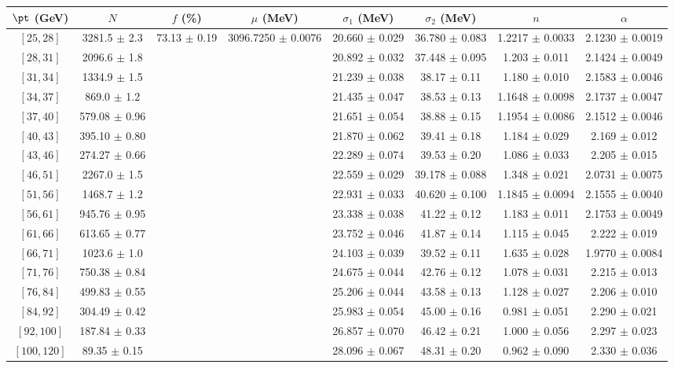 \begin{tabular}{c||c|c|c|c|c|c|c}
$\pt$ (GeV) & $N$ & $f$ (\%) & $\mu$ (MeV) & $\sigma_1$ (MeV) & $\sigma_2$ (MeV) & $n$ & $\alpha$ \\
\hline
$[25, 28]$ & 3281.5 $\pm$ 2.3 & \multirow{17}{*}{73.13 $\pm$ 0.19} & \multirow{17}{*}{3096.7250 $\pm$ 0.0076} & 20.660 $\pm$ 0.029 & 36.780 $\pm$ 0.083 & 1.2217 $\pm$ 0.0033 & 2.1230 $\pm$ 0.0019\\
$[28, 31]$ & 2096.6 $\pm$ 1.8 &  &  & 20.892 $\pm$ 0.032 & 37.448 $\pm$ 0.095 & 1.203 $\pm$ 0.011 & 2.1424 $\pm$ 0.0049\\
$[31, 34]$ & 1334.9 $\pm$ 1.5 &  &  & 21.239 $\pm$ 0.038 & 38.17 $\pm$ 0.11 & 1.180 $\pm$ 0.010 & 2.1583 $\pm$ 0.0046\\
$[34, 37]$ & 869.0 $\pm$ 1.2 &  &  & 21.435 $\pm$ 0.047 & 38.53 $\pm$ 0.13 & 1.1648 $\pm$ 0.0098 & 2.1737 $\pm$ 0.0047\\
$[37, 40]$ & 579.08 $\pm$ 0.96 &  &  & 21.651 $\pm$ 0.054 & 38.88 $\pm$ 0.15 & 1.1954 $\pm$ 0.0086 & 2.1512 $\pm$ 0.0046\\
$[40, 43]$ & 395.10 $\pm$ 0.80 &  &  & 21.870 $\pm$ 0.062 & 39.41 $\pm$ 0.18 & 1.184 $\pm$ 0.029 & 2.169 $\pm$ 0.012\\
$[43, 46]$ & 274.27 $\pm$ 0.66 &  &  & 22.289 $\pm$ 0.074 & 39.53 $\pm$ 0.20 & 1.086 $\pm$ 0.033 & 2.205 $\pm$ 0.015\\
$[46, 51]$ & 2267.0 $\pm$ 1.5 &  &  & 22.559 $\pm$ 0.029 & 39.178 $\pm$ 0.088 & 1.348 $\pm$ 0.021 & 2.0731 $\pm$ 0.0075\\
$[51, 56]$ & 1468.7 $\pm$ 1.2 &  &  & 22.931 $\pm$ 0.033 & 40.620 $\pm$ 0.100 & 1.1845 $\pm$ 0.0094 & 2.1555 $\pm$ 0.0040\\
$[56, 61]$ & 945.76 $\pm$ 0.95 &  &  & 23.338 $\pm$ 0.038 & 41.22 $\pm$ 0.12 & 1.183 $\pm$ 0.011 & 2.1753 $\pm$ 0.0049\\
$[61, 66]$ & 613.65 $\pm$ 0.77 &  &  & 23.752 $\pm$ 0.046 & 41.87 $\pm$ 0.14 & 1.115 $\pm$ 0.045 & 2.222 $\pm$ 0.019\\
$[66, 71]$ & 1023.6 $\pm$ 1.0 &  &  & 24.103 $\pm$ 0.039 & 39.52 $\pm$ 0.11 & 1.635 $\pm$ 0.028 & 1.9770 $\pm$ 0.0084\\
$[71, 76]$ & 750.38 $\pm$ 0.84 &  &  & 24.675 $\pm$ 0.044 & 42.76 $\pm$ 0.12 & 1.078 $\pm$ 0.031 & 2.215 $\pm$ 0.013\\
$[76, 84]$ & 499.83 $\pm$ 0.55 &  &  & 25.206 $\pm$ 0.044 & 43.58 $\pm$ 0.13 & 1.128 $\pm$ 0.027 & 2.206 $\pm$ 0.010\\
$[84, 92]$ & 304.49 $\pm$ 0.42 &  &  & 25.983 $\pm$ 0.054 & 45.00 $\pm$ 0.16 & 0.981 $\pm$ 0.051 & 2.290 $\pm$ 0.021\\
$[92, 100]$ & 187.84 $\pm$ 0.33 &  &  & 26.857 $\pm$ 0.070 & 46.42 $\pm$ 0.21 & 1.000 $\pm$ 0.056 & 2.297 $\pm$ 0.023\\
$[100, 120]$ & 89.35 $\pm$ 0.15 &  &  & 28.096 $\pm$ 0.067 & 48.31 $\pm$ 0.20 & 0.962 $\pm$ 0.090 & 2.330 $\pm$ 0.036\\
\end{tabular}
